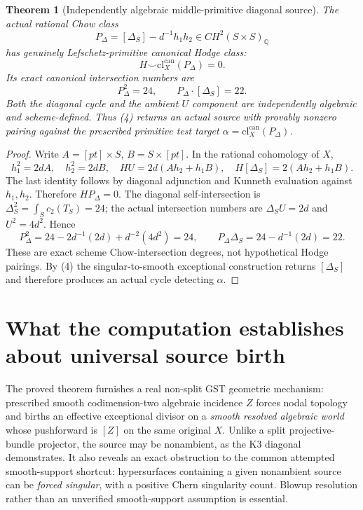 \documentclass[11pt]{article}
\newtheorem{theorem}{Theorem}
\begin{document}
\begin{theorem}[Independently algebraic middle-primitive diagonal source]
The actual rational Chow class
\[
 \boxed{P_\Delta=[\Delta_S]-d^{-1}h_1h_2\in
 CH^2(S\times S)_{\mathbb Q}}                          \tag{6}
\]
has genuinely Lefschetz-primitive canonical Hodge class:
\[
 H\smile\mathrm{cl}_X^{\mathrm{can}}(P_\Delta)=0.
\]
Its exact canonical intersection numbers are
\[
 \boxed{
 P_\Delta^2=24,\qquad
 P_\Delta\cdot[\Delta_S]=22.}                          \tag{7}
\]
Both the diagonal cycle and the ambient $U$ component
are independently algebraic and scheme-defined. Thus
(4) returns an actual source with provably nonzero
pairing against the prescribed primitive test target
$\alpha=\mathrm{cl}^{\mathrm{can}}_X(P_\Delta)$.
\end{theorem}
\begin{proof}
Write $A=[pt]\times S$, $B=S\times[pt]$.
In the rational cohomology of $X$,
\[
 h_1^2=2d A,\quad h_2^2=2d B,\quad
 H U=2d(Ah_2+h_1B),\quad
 H[\Delta_S]=2(Ah_2+h_1B).
\]
The last identity follows by diagonal adjunction and
Kunneth evaluation against $h_1,h_2$.
Therefore $HP_\Delta=0$.
The diagonal self-intersection is
$\Delta_S^2=\int_Sc_2(T_S)=24$;
the actual intersection numbers are
$\Delta_S U=2d$ and $U^2=4d^2$.
Hence
\[
 P_\Delta^2
 =24-2d^{-1}(2d)+d^{-2}(4d^2)=24,\qquad
 P_\Delta\Delta_S=24-d^{-1}(2d)=22.
\]
These are exact scheme Chow-intersection degrees, not
hypothetical Hodge pairings. By (4) the singular-to-smooth
exceptional construction returns $[\Delta_S]$ and therefore
produces an actual cycle detecting $\alpha$.
\end{proof}

\section{What the computation establishes about universal source birth}
The proved theorem furnishes a real non-split GST geometric
mechanism: prescribed smooth codimension-two algebraic
incidence $Z$ forces nodal topology and births an effective
exceptional divisor on a \emph{smooth resolved algebraic world}
whose pushforward is $[Z]$ on the same original $X$.
Unlike a split projective-bundle projector, the source
may be nonambient, as the K3 diagonal demonstrates.
It also reveals an exact obstruction to the common attempted
smooth-support shortcut: hypersurfaces containing a given
nonambient source can be \emph{forced singular}, with a
positive Chern singularity count. Blowup resolution rather
than an unverified smooth-support assumption is essential.
\end{document}
